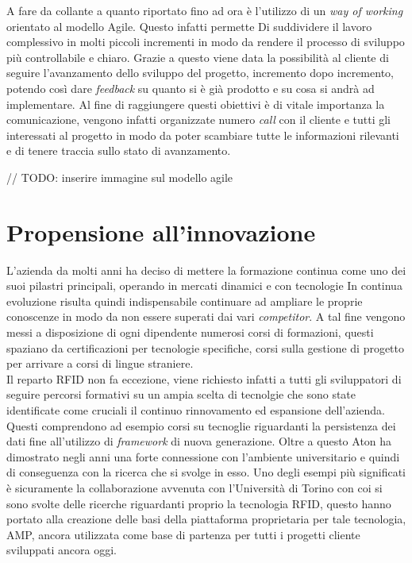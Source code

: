 A fare da collante a quanto riportato fino ad ora è l'utilizzo di un \emph{way of working} orientato al modello Agile. Questo infatti permette Di
suddividere il lavoro complessivo in molti piccoli incrementi in modo da rendere il processo di sviluppo più controllabile e chiaro.
Grazie a questo viene data la possibilità al cliente di seguire l'avanzamento dello sviluppo del progetto, incremento dopo incremento, potendo così 
dare \emph{feedback} su quanto si è già prodotto e su cosa si andrà ad implementare.
Al fine di raggiungere questi obiettivi è di vitale importanza la comunicazione, vengono infatti organizzate numero \emph{call} con il cliente e tutti gli
interessati al progetto in modo da poter scambiare tutte le informazioni rilevanti e di tenere traccia sullo stato di avanzamento.

// TODO: inserire immagine sul modello agile

\section{Propensione all'innovazione}

L'azienda da molti anni ha deciso di mettere la formazione continua come uno dei suoi pilastri principali, operando in mercati dinamici e con tecnologie In
continua evoluzione risulta quindi indispensabile continuare ad ampliare le proprie conoscenze in modo da non essere superati dai vari \emph{competitor}.
A tal fine vengono messi a disposizione di ogni dipendente numerosi corsi di formazioni, questi spaziano da certificazioni per tecnologie specifiche, corsi
sulla gestione di progetto per arrivare a corsi di lingue straniere. \\
Il reparto RFID non fa eccezione, viene richiesto infatti a tutti gli sviluppatori di seguire percorsi formativi su un ampia scelta di tecnolgie che sono state
identificate come cruciali il continuo rinnovamento ed espansione dell'azienda. Questi comprendono ad esempio corsi su tecnoglie riguardanti la persistenza
dei dati fine all'utilizzo di \emph{framework} di nuova generazione.
Oltre a questo Aton ha dimostrato negli anni una forte connessione con l'ambiente universitario e quindi di conseguenza con la ricerca che si svolge in esso.
Uno degli esempi più significati è sicuramente la collaborazione avvenuta con l'Università di Torino con coi si sono svolte delle ricerche riguardanti proprio
la tecnologia RFID, questo hanno portato alla creazione delle basi della piattaforma proprietaria per tale tecnologia, AMP, ancora utilizzata come base di
partenza per tutti i progetti cliente sviluppati ancora oggi. 



